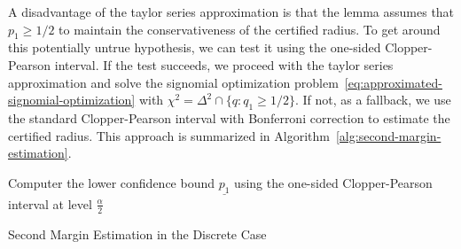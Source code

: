 A disadvantage of the taylor series approximation is that the lemma assumes that $p_1\geq1/2$ to maintain the conservativeness of the certified radius.
To get around this potentially untrue hypothesis, we can test it using the one-sided Clopper-Pearson interval.
If the test succeeds, we proceed with the taylor series approximation and solve the signomial optimization problem~\eqref{eq:approximated-signomial-optimization} with $\chi^2=\Delta^2\cap\{q:q_1\geq1/2\}$.
If not, as a fallback, we use the standard Clopper-Pearson interval with Bonferroni correction to estimate the certified radius.
This approach is summarized in Algorithm~\ref{alg:second-margin-estimation}.
\begin{algorithm}[htbp]
    \DontPrintSemicolon %
    Computer the lower confidence bound $\underline{p_1}$ using the one-sided Clopper-Pearson interval at level $\frac{\alpha}{2}$\;
    \caption{Second Margin Estimation in the Discrete Case}\label{alg:second-margin-estimation}
\end{algorithm}
